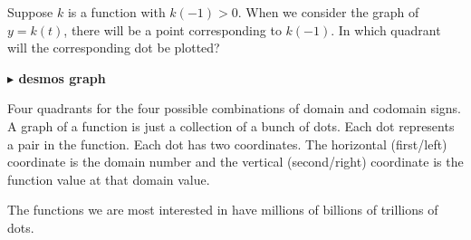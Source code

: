 \documentclass{ximera}
\begin{document}
\begin{question}
Suppose $k$ is a function with $k(-1)>0$. When we consider the graph of $y=k(t)$, there will be a point corresponding to $k(-1)$. In which quadrant will the corresponding dot be plotted?
\begin{image}
\end{image}

\begin{onlineOnly}
\textbf{\textcolor{blue!55!black}{$\blacktriangleright$ desmos graph}} 
\begin{center}
\end{center}
\end{onlineOnly}


\begin{multipleChoice}
\end{multipleChoice}

\end{question}
Four quadrants for the four possible combinations of domain and codomain signs. \\


A graph of a function is just a collection of a bunch of dots.  Each dot represents a pair in the function.  Each dot has two coordinates.  The horizontal (first/left) coordinate is the domain number and the vertical (second/right) coordinate is the function value at that domain value.

The functions we are most interested in have millions of billions of trillions of dots.  
\end{document}
